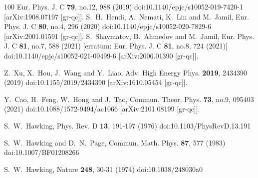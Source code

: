 \documentclass[a4paper,11pt]{article}
\begin{document}
\begin{thebibliography}{100}
Eur. Phys. J. C \textbf{79}, no.12, 988 (2019)
doi:10.1140/epjc/s10052-019-7420-1
[arXiv:1908.07197 [gr-qc]].
S.~H.~Hendi, A.~Nemati, K.~Lin and M.~Jamil,
Eur. Phys. J. C \textbf{80}, no.4, 296 (2020)
doi:10.1140/epjc/s10052-020-7829-6
[arXiv:2001.01591 [gr-qc]].
S.~Shaymatov, B.~Ahmedov and M.~Jamil,
Eur. Phys. J. C \textbf{81}, no.7, 588 (2021)
[erratum: Eur. Phys. J. C \textbf{81}, no.8, 724 (2021)]
doi:10.1140/epjc/s10052-021-09499-6
[arXiv:2006.01390 [gr-qc]].

Z.~Xu, X.~Hou, J.~Wang and Y.~Liao,
Adv. High Energy Phys. \textbf{2019}, 2434390 (2019)
doi:10.1155/2019/2434390
[arXiv:1610.05454 [gr-qc]].

Y.~Cao, H.~Feng, W.~Hong and J.~Tao,
Commun. Theor. Phys. \textbf{73}, no.9, 095403 (2021)
doi:10.1088/1572-9494/ac1066
[arXiv:2101.08199 [gr-qc]].

S.~W.~Hawking,
Phys. Rev. D \textbf{13}, 191-197 (1976)
doi:10.1103/PhysRevD.13.191

S.~W.~Hawking and D.~N.~Page,
Commun. Math. Phys. \textbf{87}, 577 (1983)
doi:10.1007/BF01208266


S.~W.~Hawking,
Nature \textbf{248}, 30-31 (1974)
doi:10.1038/248030a0


\end{thebibliography}
\end{document}
